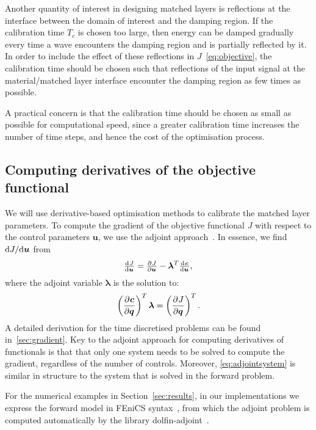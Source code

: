 \documentclass[a4paper]{article}
\renewcommand{\vec}{\boldsymbol}
\begin{document}
Another quantity of interest in designing matched layers is
reflections at the interface between the domain of interest and the
damping region. If the calibration time $T_{c}$ is chosen too large,
then energy can be damped gradually every time a wave encounters the
damping region and is partially reflected by it. In order to include
the effect of these reflections in $J$~\eqref{eq:objective}, the
calibration time should be chosen such that reflections of the input
signal at the material/matched layer interface encounter the damping
region as few times as possible.

A practical concern is that the calibration time should be chosen as
small as possible for computational speed, since a greater calibration
time increases the number of time steps, and hence the cost of the
optimisation process.

\subsection{Computing derivatives of the objective functional}
\label{sec:adjoint}

We will use derivative-based optimisation methods to calibrate the
matched layer parameters. To compute the gradient of the objective
functional $J$ with respect to the control parameters $\vec{u}$, we
use the adjoint approach~\citep{troeltzsch10}. In essence, we find
${\rm d}J / {\rm d} \vec{u}$ from
\begin{equation}
  \od{J}{\vec{u}} = \pd{J}{\vec{u}} - \vec{\lambda}^{T} \od{\vec{c}}{\vec{u}},
\end{equation}
where the adjoint variable $\vec{\lambda}$ is the solution to:
\begin{equation}
  \del{\dpd{\vec{c}}{\vec{q}}}^{T} \vec{\lambda}
    =  \del{\dpd{J}{\vec{q}}}^{T}.
    \label{eq:adjointsystem}
\end{equation}
A detailed derivation for the time discretised problems can be found
in~\ref{sec:gradient}.  Key to the adjoint approach for computing
derivatives of functionals is that that only one system needs to be
solved to compute the gradient, regardless of the number of controls.
Moreover, \eqref{eq:adjointsystem} is similar in structure to the
system that is solved in the forward problem.

For the numerical examples in Section~\ref{sec:results}, in our
implementations we express the forward model in FEniCS
syntax~\citep{alnaes:2014, logg10wells, logg12etall}, from which the
adjoint problem is computed automatically by the library
dolfin-adjoint~\citep{funke13farrell}.
\end{document}
